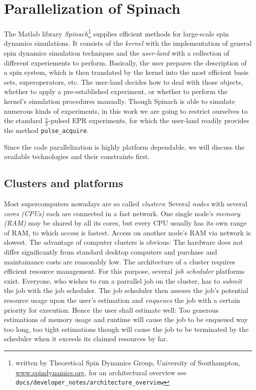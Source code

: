 \documentclass[11.5pt,a4paper]{article}
\begin{document}
\section{Parallelization of Spinach}

The Matlab library \emph{Spinach}\footnote{written by Theoretical Spin Dynamics Group, University of Southampton, \url{www.spindynamics.org}, for an architectural overview see \verb$docs/developer_notes/architecture_overview$} supplies efficient methods for large-scale spin dynamics simulations. It consists of the \emph{kernel} with the implementation of general spin dynamics simulation techniques and the \emph{user-land} with a collection of different experiements to perform. Basically, the user prepares the description of a spin system, which is then translated by the kernel into the most efficient basis sets, superoperators, etc. The user-land decides how to deal with those objects, whether to apply a pre-established experiment, or whether to perform the kernel's simulation procedures manually. Though Spinach is able to simulate numerous kinds of experiments, in this work we are going to restrict ourselves to the standard $\tfrac{\pi}{2}$-pulsed EPR experiments, for which the user-land readily provides the method \verb|pulse_acquire|. 

Since the code parallelization is highly platform dependable, we will discuss the available technologies and their constraints first.
\subsection{Clusters and platforms}
Most supercomputers nowadays are so called \emph{clusters}: Several \emph{nodes} with several \emph{cores (CPUs)} each are connected in a fast network. One single node's \emph{memory (RAM)} may be shared by all its cores, but every CPU usually has its own range of RAM, to which access is fastest. Access on another node's RAM via network is slowest. The advantage of computer clusters is obvious: The hardware does not differ significantly from standard desktop computers and purchase and maintainance costs are reasonably low. 
The architecture of a cluster requires efficient resource management. For this purpose, several \emph{job scheduler} platforms exist. Everyone, who wishes to run a parrallel job on the cluster, has to \emph{submit} the job with the job scheduler. The job scheduler then asseses the job's potential resource usage upon the user's estimation and \emph{enqueues} the job with a certain priority for execution. Hence the user shall estimate well: Too generous estimations of memory usage and runtime will cause the job to be enqueued way too long, too tight estimations though will cause the job to be terminated by the scheduler when it exceeds its claimed resources by far. 
\end{document}
